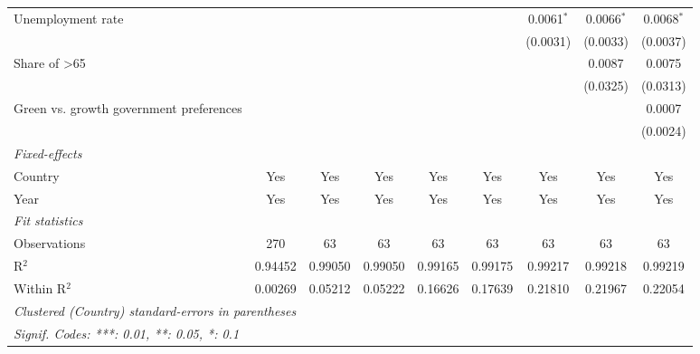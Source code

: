 \begin{table}[htbp]
\begin{tabular}{lcccccccc}
      Unemployment rate                                       &          &          &          &              &              & 0.0061$^{*}$ & 0.0066$^{*}$ & 0.0068$^{*}$\\   
                                                              &          &          &          &              &              & (0.0031)     & (0.0033)     & (0.0037)\\   
      Share of >65                                            &          &          &          &              &              &              & 0.0087       & 0.0075\\   
                                                              &          &          &          &              &              &              & (0.0325)     & (0.0313)\\   
      Green vs. growth government preferences                 &          &          &          &              &              &              &              & 0.0007\\   
                                                              &          &          &          &              &              &              &              & (0.0024)\\   
      \midrule
      \emph{Fixed-effects}\\
      Country                                                 & Yes      & Yes      & Yes      & Yes          & Yes          & Yes          & Yes          & Yes\\  
      Year                                                    & Yes      & Yes      & Yes      & Yes          & Yes          & Yes          & Yes          & Yes\\  
      \midrule
      \emph{Fit statistics}\\
      Observations                                            & 270      & 63       & 63       & 63           & 63           & 63           & 63           & 63\\  
      R$^2$                                                   & 0.94452  & 0.99050  & 0.99050  & 0.99165      & 0.99175      & 0.99217      & 0.99218      & 0.99219\\  
      Within R$^2$                                            & 0.00269  & 0.05212  & 0.05222  & 0.16626      & 0.17639      & 0.21810      & 0.21967      & 0.22054\\  
      \midrule \midrule
      \multicolumn{9}{l}{\emph{Clustered (Country) standard-errors in parentheses}}\\
      \multicolumn{9}{l}{\emph{Signif. Codes: ***: 0.01, **: 0.05, *: 0.1}}\\
   \end{tabular}
\end{table}


